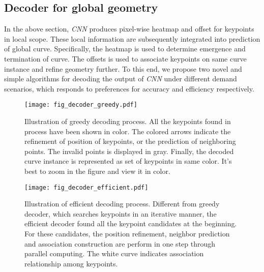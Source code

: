 \documentclass[final]{cvpr}
\begin{document}
\thispagestyle{empty}
\subsection{Decoder for global geometry}
\label{subsection:decoder}
In the above section, \textit{CNN} produces pixel-wise
heatmap and offset for keypoints in local scope. These local information 
are subsequently integrated into prediction of
global curve. Specifically, the heatmap is used to determine
emergence and termination of curve. The offsets is used
to associate keypoints on same curve instance and refine
geometry further. To this end, we propose two novel and simple algorithms
for decoding the output of \textit{CNN} under different demand scenarios, which responds to
preferences for accuracy and efficiency respectively.




\begin{figure*}[t]
	\begin{center}
		\texttt{[image: fig\_decoder\_greedy.pdf]}
	\end{center}
	\caption{Illustration of greedy decoding process. All the keypoints found in process have been shown in color. The colored arrows indicate the refinement of position of keypoints, or the prediction of neighboring points. The invalid points is displayed in gray. Finally, the decoded curve instance is represented as set of keypoints in same color. It's best to zoom in the figure and view it in color.}
	\label{fig:decoder_greedy}
\end{figure*}

\begin{figure*}[t]
	\begin{center}
		\texttt{[image: fig\_decoder\_efficient.pdf]}
	\end{center}
	\caption{Illustration of efficient decoding process. Different from greedy decoder, which searches keypoints in an iterative manner, the efficient decoder found all the keypoint candidates at the beginning. For these candidates, the position refinement, neighbor prediction and association construction are perform in one step through parallel computing. The white curve indicates association relationship among keypoints.}
	\label{fig:decoder_efficient}
\end{figure*}
\end{document}
